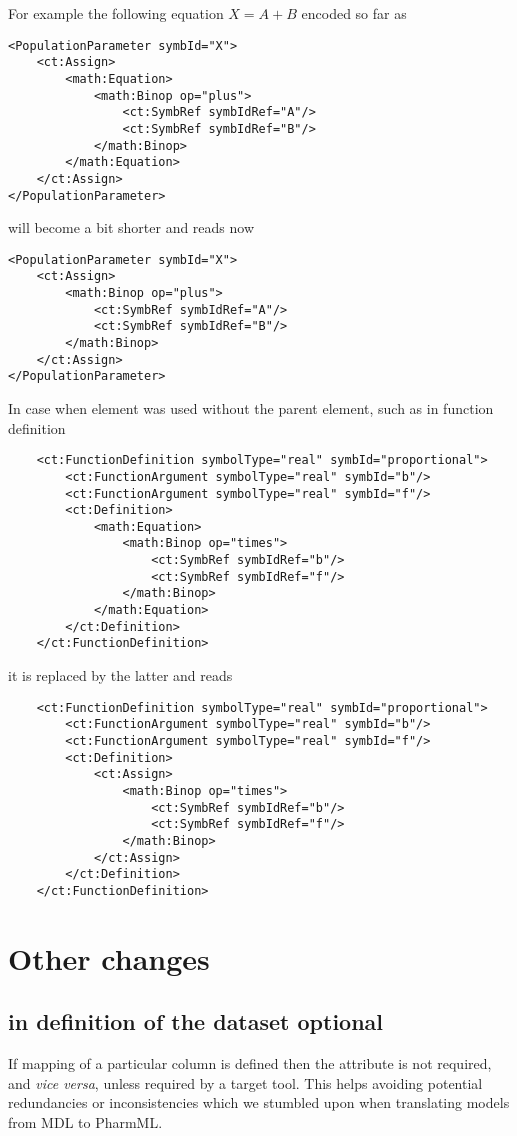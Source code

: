 For example the following equation $X = A + B$ encoded so far
as 
\lstset{language=XML}
\begin{lstlisting}
<PopulationParameter symbId="X">
    <ct:Assign>
        <math:Equation>
            <math:Binop op="plus">
                <ct:SymbRef symbIdRef="A"/>
                <ct:SymbRef symbIdRef="B"/>
            </math:Binop>
        </math:Equation>
    </ct:Assign>
</PopulationParameter>
\end{lstlisting}
will become a bit shorter and reads now
\lstset{language=XML}
\begin{lstlisting}
<PopulationParameter symbId="X">
    <ct:Assign>
        <math:Binop op="plus">
            <ct:SymbRef symbIdRef="A"/>
            <ct:SymbRef symbIdRef="B"/>
        </math:Binop>
    </ct:Assign>
</PopulationParameter>
\end{lstlisting}
In case when  element was used without the parent  element, such as 
in function definition
\lstset{language=XML}
\begin{lstlisting}
    <ct:FunctionDefinition symbolType="real" symbId="proportional">
        <ct:FunctionArgument symbolType="real" symbId="b"/>
        <ct:FunctionArgument symbolType="real" symbId="f"/>
        <ct:Definition>
            <math:Equation>
                <math:Binop op="times">
                    <ct:SymbRef symbIdRef="b"/>
                    <ct:SymbRef symbIdRef="f"/>
                </math:Binop>
            </math:Equation>
        </ct:Definition>
    </ct:FunctionDefinition>
\end{lstlisting}
it is replaced by the latter and reads
\lstset{language=XML}
\begin{lstlisting}
    <ct:FunctionDefinition symbolType="real" symbId="proportional">
        <ct:FunctionArgument symbolType="real" symbId="b"/>
        <ct:FunctionArgument symbolType="real" symbId="f"/>
        <ct:Definition>
            <ct:Assign>
                <math:Binop op="times">
                    <ct:SymbRef symbIdRef="b"/>
                    <ct:SymbRef symbIdRef="f"/>
                </math:Binop>
            </ct:Assign>
        </ct:Definition>
    </ct:FunctionDefinition>
\end{lstlisting}


\section{Other changes}

\subsection{ in definition of the dataset optional}
If mapping of a particular column is defined then the  attribute is 
not required, and \emph{vice versa}, unless required by a target tool. This helps avoiding potential 
redundancies or inconsistencies which we stumbled upon when translating 
models from MDL to PharmML. 

